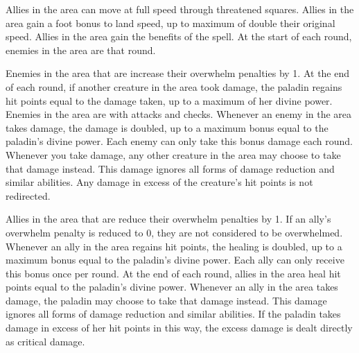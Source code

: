         Allies in the area can move at full speed through threatened squares.
        Allies in the area gain a  foot bonus to land speed, up to maximum of double their original speed.
        Allies in the area gain the benefits of the  spell.
        At the start of each round, enemies in the area are \disoriented that round.

        Enemies in the area that are  increase their overwhelm penalties by 1.
        At the end of each round, if another creature in the area took damage, the paladin regains hit points equal to the damage taken, up to a maximum of her divine power.
        Enemies in the area are \impaired with attacks and checks.
        Whenever an enemy in the area takes damage, the damage is doubled, up to a maximum bonus equal to the paladin's divine power.
        Each enemy can only take this bonus damage each round.
        Whenever you take damage, any other creature in the area may choose to take that damage instead.
        This damage ignores all forms of damage reduction and similar abilities.
        Any damage in excess of the creature's hit points is not redirected.

        Allies in the area that are  reduce their overwhelm penalties by 1.
        If an ally's overwhelm penalty is reduced to 0, they are not considered to be overwhelmed.
        Whenever an ally in the area regains hit points, the healing is doubled, up to a maximum bonus equal to the paladin's divine power.
        Each ally can only receive this bonus once per round.
        At the end of each round, allies in the area heal hit points equal to the paladin's divine power.
        Whenever an ally in the area takes damage, the paladin may choose to take that damage instead.
        This damage ignores all forms of damage reduction and similar abilities.
        If the paladin takes damage in excess of her hit points in this way, the excess damage is dealt directly as critical damage.

